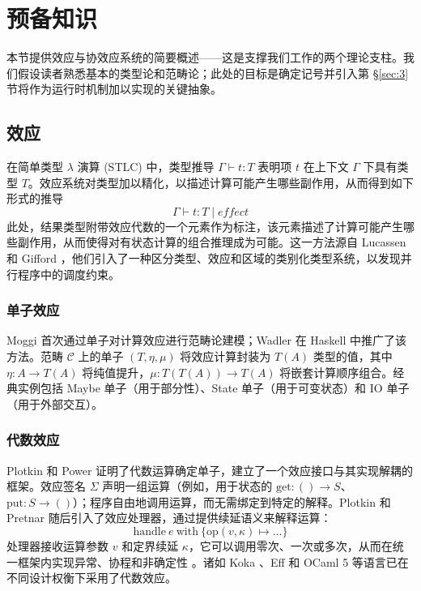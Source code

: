 \section{预备知识}
\label{sec:2}

本节提供效应与协效应系统的简要概述——这是支撑我们工作的两个理论支柱。我们假设读者熟悉基本的类型论和范畴论；此处的目标是确定记号并引入第 \S\ref{sec:3} 节将作为运行时机制加以实现的关键抽象。

\subsection{效应}
\label{sec:2.1}

在简单类型 $\lambda$ 演算 (STLC) \cite{ref20, ref21} 中，类型推导 $\Gamma \vdash t : T$ 表明项 $t$ 在上下文 $\Gamma$ 下具有类型 $T$。效应系统对类型加以精化，以描述计算可能产生哪些副作用，从而得到如下形式的推导
\begin{equation}
\label{eq:2.1}
\Gamma \vdash t : T \mid \textit{effect}
\end{equation}
此处，结果类型附带效应代数的一个元素作为标注，该元素描述了计算可能产生哪些副作用，从而使得对有状态计算的组合推理成为可能。这一方法源自 Lucassen 和 Gifford \cite{ref22}，他们引入了一种区分类型、效应和区域的类别化类型系统，以发现并行程序中的调度约束。

\subsubsection{单子效应}
\label{sec:2.1.1}

Moggi \cite{ref16} 首次通过单子对计算效应进行范畴论建模；Wadler \cite{ref23} 在 Haskell 中推广了该方法。范畴 $\mathcal{C}$ 上的单子 $(T, \eta, \mu)$ 将效应计算封装为 $T(A)$ 类型的值，其中 $\eta : A \to T(A)$ 将纯值提升，$\mu : T(T(A)) \to T(A)$ 将嵌套计算顺序组合。经典实例包括 Maybe 单子（用于部分性）、State 单子（用于可变状态）和 IO 单子（用于外部交互）。

\subsubsection{代数效应}
\label{sec:2.1.2}

Plotkin 和 Power \cite{ref17, ref24} 证明了代数运算确定单子，建立了一个效应接口与其实现解耦的框架。效应签名 $\Sigma$ 声明一组运算（例如，用于状态的 $\mathrm{get} : () \to S$、$\mathrm{put} : S \to ()$）；程序自由地调用运算，而无需绑定到特定的解释。Plotkin 和 Pretnar \cite{ref25} 随后引入了效应处理器，通过提供续延语义来解释运算：
\begin{equation}
\label{eq:2.2}
\mathrm{handle}\ e\ \mathrm{with}\ \{ \mathrm{op}(v, \kappa) \mapsto \ldots \}
\end{equation}
处理器接收运算参数 $v$ 和定界续延 $\kappa$，它可以调用零次、一次或多次，从而在统一框架内实现异常、协程和非确定性 \cite{ref26}。诸如 Koka \cite{ref27, ref28}、Eff \cite{ref29} 和 OCaml 5 \cite{ref30} 等语言已在不同设计权衡下采用了代数效应。

